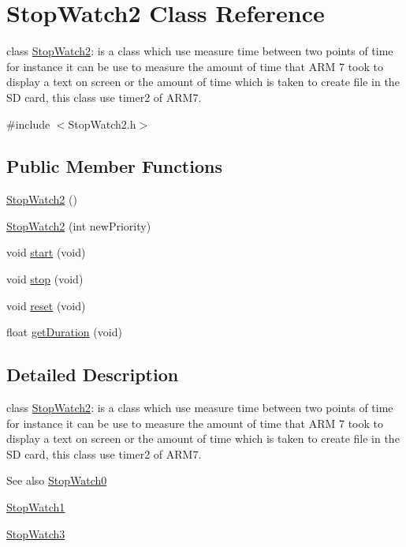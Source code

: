 \hypertarget{class_stop_watch2}{
\section{StopWatch2 Class Reference}
\label{class_stop_watch2}
}


class \hyperlink{class_stop_watch2}{StopWatch2}: is a class which use measure time between two points of time for instance it can be use to measure the amount of time that ARM 7 took to display a text on screen or the amount of time which is taken to create file in the SD card, this class use timer2 of ARM7.  




{\ttfamily \#include $<$StopWatch2.h$>$}

\subsection*{Public Member Functions}
\begin{DoxyCompactItemize}
\item 
\hyperlink{class_stop_watch2_ab106264849ec08dab55b0bea3174130e}{StopWatch2} ()
\item 
\hyperlink{class_stop_watch2_a307210caa6a62c35a5261b30a2bdf094}{StopWatch2} (int newPriority)
\item 
void \hyperlink{class_stop_watch2_a29fb45d9597bccfa6d63f93482436c36}{start} (void)
\item 
void \hyperlink{class_stop_watch2_a15919995d29787101992c7bdd97f1e74}{stop} (void)
\item 
void \hyperlink{class_stop_watch2_a160723a656745e86a638f23185894a79}{reset} (void)
\item 
float \hyperlink{class_stop_watch2_a10d27376c0b0d3a52d0ec874a89df9ad}{getDuration} (void)
\end{DoxyCompactItemize}


\subsection{Detailed Description}
class \hyperlink{class_stop_watch2}{StopWatch2}: is a class which use measure time between two points of time for instance it can be use to measure the amount of time that ARM 7 took to display a text on screen or the amount of time which is taken to create file in the SD card, this class use timer2 of ARM7. 

\begin{DoxySeeAlso}{See also}
\hyperlink{class_stop_watch0}{StopWatch0} 

\hyperlink{class_stop_watch1}{StopWatch1} 

\hyperlink{class_stop_watch3}{StopWatch3} 
\end{DoxySeeAlso}


